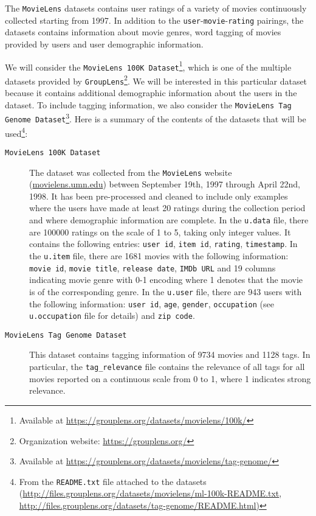 \documentclass[bj, preprint]{imsart}
\begin{document}
The \texttt{MovieLens} datasets \citep{harper2015MovieLensDatasetsHistory} contains user ratings of a variety of movies continuously collected starting from 1997. 
In addition to the \texttt{user}-\texttt{movie}-\texttt{rating} pairings, the datasets contains information about movie genres, word tagging of movies provided by users and user demographic information. 

We will consider the \texttt{MovieLens 100K Dataset}\footnote{Available at \url{https://grouplens.org/datasets/movielens/100k/}}, which is one of the multiple datasets provided by \texttt{GroupLens}\footnote{Organization website: \url{https://grouplens.org/}}. 
We will be interested in this particular dataset because it contains additional demographic information about the users in the dataset. 
To include tagging information, we also consider the \texttt{MovieLens Tag Genome Dataset}\footnote{Available at \url{https://grouplens.org/datasets/movielens/tag-genome/}}. 
Here is a summary of the contents of the datasets that will be used\footnote{From the \texttt{README.txt} file attached to the datasets (\url{http://files.grouplens.org/datasets/movielens/ml-100k-README.txt}, \url{http://files.grouplens.org/datasets/tag-genome/README.html)}}:

\begin{description}
	\item[\texttt{MovieLens 100K Dataset}] 
	The dataset was collected from the \texttt{MovieLens} website (\url{movielens.umn.edu}) between September 19th, 1997 through April 22nd, 1998. 
	It has been pre-processed and cleaned to include only examples where the users have made at least 20 ratings during the collection period and where demographic information are complete. 
	In the \texttt{u.data} file, there are \num{100000} ratings on the scale of 1 to 5, taking only integer values. 
	It contains the following entries: \texttt{user id}, \texttt{item id}, \texttt{rating}, \texttt{timestamp}. 
	In the \texttt{u.item} file, there are \num{1681} movies with the following information: \texttt{movie id}, \texttt{movie title}, \texttt{release date}, \texttt{IMDb URL} and 19 columns indicating movie genre with 0-1 encoding where 1 denotes that the movie is of the corresponding genre. 
	In the \texttt{u.user} file, there are \num{943} users with the following information: \texttt{user id}, \texttt{age}, \texttt{gender}, \texttt{occupation} (see \texttt{u.occupation} file for details) and \texttt{zip code}.
	\item[\texttt{MovieLens Tag Genome Dataset}] 
	This dataset contains tagging information of \num{9734} movies and \num{1128} tags. 
	In particular, the \texttt{tag\_relevance} file contains the relevance of all tags for all movies reported on a continuous scale from 0 to 1, where 1 indicates strong relevance.
\end{description}
\end{document}
